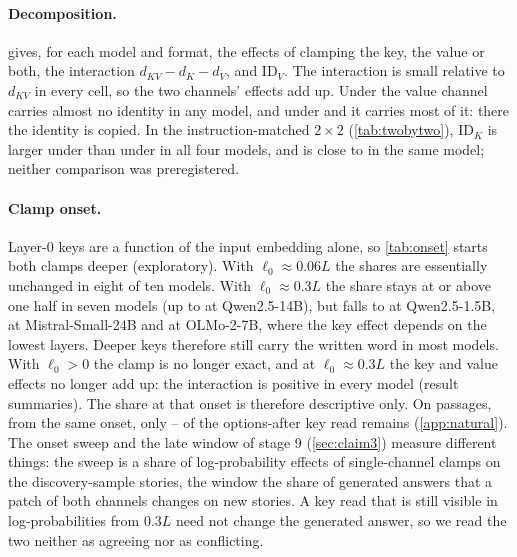 \paragraph{Decomposition.}  gives, for each model and format, the effects of clamping the key, the value or both, the interaction $d_{KV} - d_K - d_V$, and $\mathrm{ID}_V$. The interaction is small relative to $d_{KV}$ in every cell, so the two channels' effects add up. Under \fmtLetter{} the value channel carries almost no identity in any model, and under \fmtNone{} and \fmtBefore{} it carries most of it: there the identity is copied. In the instruction-matched $2{\times}2$ (\cref{tab:twobytwo}), $\mathrm{ID}_K$ is larger under \fmtListA{} than under \fmtPost{} in all four models, and \fmtListA{} is close to \fmtOpt{} in the same model; neither comparison was preregistered.

\begin{table}[!ht]
\centering
\footnotesize
\caption{\textbf{Key/value decomposition.} Mean effects (nats of $m_{\mathrm{SB}}$) of clamping the writing token's key ($d_K$), value ($d_V$) or both ($d_{KV}$) to the source run's from layer~0, measured against the self-clamp row; the interaction $d_{KV} - d_K - d_V$ with its 95\% bootstrap CI; and the value identity $\mathrm{ID}_V$ (nats). $n = 150$ stories per format and model.}
\label{tab:decomposition}

\end{table}

\paragraph{Clamp onset.} Layer-0 keys are a function of the input embedding alone, so \cref{tab:onset} starts both clamps deeper (exploratory). With $\ell_0 \approx 0.06L$ the shares are essentially unchanged in eight of ten models. With $\ell_0 \approx 0.3L$ the share stays at or above one half in seven models (up to \onsetLateQwenFourteen{} at Qwen2.5-14B), but falls to \onsetLateQwenOnefive{} at Qwen2.5-1.5B, \onsetLateMistralTwentyfour{} at Mistral-Small-24B and \onsetLateOlmoSeven{} at OLMo-2-7B, where the key effect depends on the lowest layers. Deeper keys therefore still carry the written word in most models. With $\ell_0 > 0$ the clamp is no longer exact, and at $\ell_0 \approx 0.3L$ the key and value effects no longer add up: the interaction is positive in every model (result summaries). The share at that onset is therefore descriptive only. On passages, from the same onset, only \JaEoneOnOptaMin--\JaEoneOnOptaMax{} of the options-after key read remains (\cref{app:natural}). The onset sweep and the late window of stage 9 (\cref{sec:claim3}) measure different things: the sweep is a share of log-probability effects of single-channel clamps on the discovery-sample stories, the window the share of generated answers that a patch of both channels changes on new stories. A key read that is still visible in log-probabilities from $0.3L$ need not change the generated answer, so we read the two neither as agreeing nor as conflicting.

